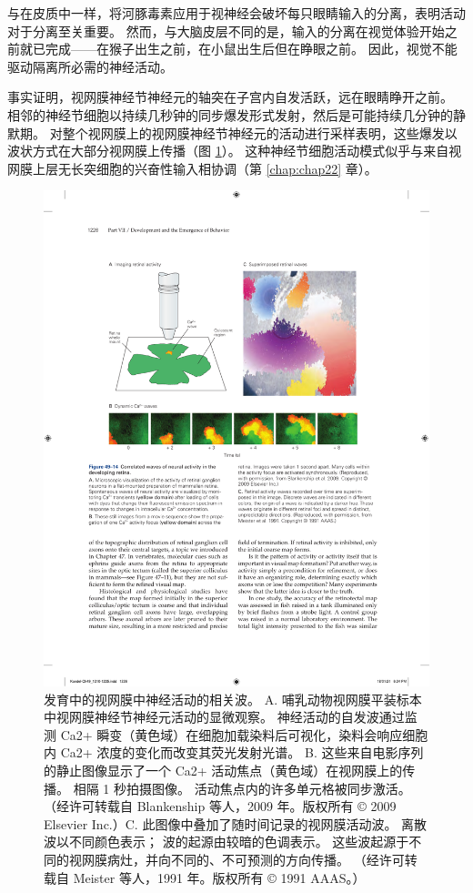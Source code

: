 与在皮质中一样，将河豚毒素应用于视神经会破坏每只眼睛输入的分离，表明活动对于分离至关重要。
然而，与大脑皮层不同的是，输入的分离在视觉体验开始之前就已完成——在猴子出生之前，在小鼠出生后但在睁眼之前。
因此，视觉不能驱动隔离所必需的神经活动。


事实证明，视网膜神经节神经元的轴突在子宫内自发活跃，远在眼睛睁开之前。
相邻的神经节细胞以持续几秒钟的同步爆发形式发射，然后是可能持续几分钟的静默期。
对整个视网膜上的视网膜神经节神经元的活动进行采样表明，这些爆发以波状方式在大部分视网膜上传播（图 \ref{fig:49_14}）。
这种神经节细胞活动模式似乎与来自视网膜上层无长突细胞的兴奋性输入相协调（第 \ref{chap:chap22} 章）。


\begin{figure}[htbp]
	\centering
	\includegraphics[width=0.8\linewidth]{chap49/fig_49_14}
	\caption{发育中的视网膜中神经活动的相关波。 A. 哺乳动物视网膜平装标本中视网膜神经节神经元活动的显微观察。 神经活动的自发波通过监测 Ca2+ 瞬变（黄色域）在细胞加载染料后可视化，染料会响应细胞内 Ca2+ 浓度的变化而改变其荧光发射光谱。 B. 这些来自电影序列的静止图像显示了一个 Ca2+ 活动焦点（黄色域）在视网膜上的传播。 相隔 1 秒拍摄图像。 活动焦点内的许多单元格被同步激活。 （经许可转载自 Blankenship 等人，2009 年。版权所有 © 2009 Elsevier Inc.）C. 此图像中叠加了随时间记录的视网膜活动波。 离散波以不同颜色表示； 波的起源由较暗的色调表示。 这些波起源于不同的视网膜病灶，并向不同的、不可预测的方向传播。 （经许可转载自 Meister 等人，1991 年。版权所有 © 1991 AAAS。）}
	\label{fig:49_14}
\end{figure}


